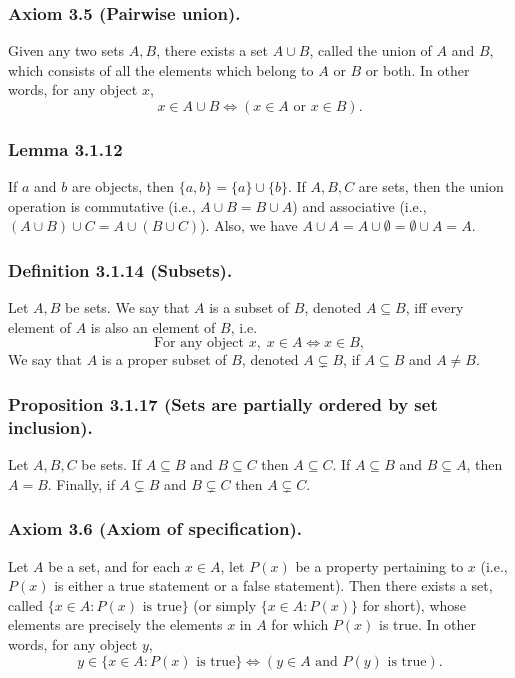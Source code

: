 \documentclass[12pt, letter]{article}
\begin{document}
\subsubsection*{Axiom 3.5 (Pairwise union).}
Given any two sets $A,B$, there exists a set $A\cup B$, called the union of $A$ and $B$, which consists of all the elements which belong to $A$ or $B$ or both. In other words, for any object $x$,
\begin{equation*}
    x\in A\cup B\iff (x\in A \text{ or } x\in B).
\end{equation*}
\subsubsection*{Lemma 3.1.12}
If $a$ and $b$ are objects, then $\{a,b\}=\{a\}\cup\{b\}$. If $A,B,C$ are sets, then the union operation is commutative (i.e., $A\cup B=B\cup A$) and associative (i.e., $(A\cup B)\cup C=A\cup (B\cup C)$). Also,
we have $A\cup A=A\cup\emptyset=\emptyset\cup A=A$.
\subsubsection*{Definition 3.1.14 (Subsets).}
Let $A,B$ be sets. We say that $A$ is a subset of $B$, denoted $A\subseteq B$, iff every element of $A$ is also an element of $B$, i.e.
\begin{equation*}
    \text{For any object }x,\; x\in A\iff x\in B,
\end{equation*} 
We say that $A$ is a proper subset of $B$, denoted $A\subsetneq B$, if $A\subseteq B$ and $A\ne B$.
\subsubsection*{Proposition 3.1.17 (Sets are partially ordered by set inclusion).}
Let $A,B,C$ be sets. If $A\subseteq B$ and $B\subseteq C$ then $A\subseteq C$. If $A\subseteq B$ and $B\subseteq A$, then $A=B$. Finally, if $A\subsetneq B$ and $B\subsetneq C$ then $A\subsetneq C$.
\subsubsection*{Axiom 3.6 (Axiom of specification).}
Let $A$ be a set, and for each $x\in A$, let $P(x)$ be a property pertaining to $x$ (i.e., $P(x)$ is either a true statement or a false statement). Then there exists a set, called 
$\{x\in A: P(x)\text{ is true}\}$ (or simply $\{x\in A: P(x)\}$ for short), whose elements are precisely the elements $x$ in $A$ for which $P(x)$ is true. In other words, for any object $y$,
\begin{equation*}
    y\in\{x\in A: P(x)\text{ is true}\} \iff (y\in A\text{ and }P(y)\text{ is true}).
\end{equation*}
\end{document}
